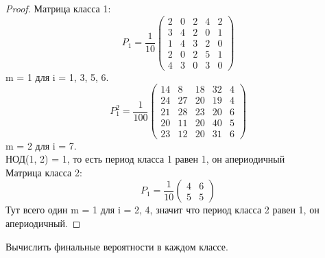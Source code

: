 \begin{proof}
Матрица класса 1:
\[
P_1 = \frac{1}{10}\begin{pmatrix}
    2 & 0 & 2 & 4 & 2 \\
    3 & 4 & 2 & 0 & 1 \\
    1 & 4 & 3 & 2 & 0 \\
    2 & 0 & 2 & 5 & 1 \\
    4 & 3 & 0 & 3 & 0
\end{pmatrix}
\]
m = 1 для i = {1, 3, 5, 6}.\\
\[
P_1^2 = \frac{1}{100}\begin{pmatrix}
    14 & 8  & 18 & 32 & 4 \\
    24 & 27 & 20 & 19 & 4 \\
    21 & 28 & 23 & 20 & 6 \\
    20 & 11 & 20 & 40 & 5 \\
    23 & 12 & 20 & 31 & 6
\end{pmatrix}
\]
m = 2 для i = 7.\\
НОД(1, 2) = 1, то есть период класса 1 равен 1, он апериодичный\\
Матрица класса 2:
\[
P_1 = \frac{1}{10}\begin{pmatrix}
    4 & 6 \\
    5 & 5
\end{pmatrix}
\]
Тут всего один m = 1 для i = {2, 4}, значит что период класса 2 равен 1, он апериодичный.
\end{proof}

\begin{problem}
Вычислить финальные вероятности в каждом классе.
\end{problem}

